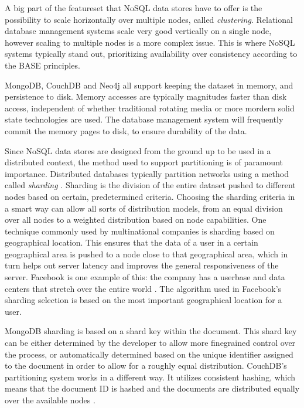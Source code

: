 A big part of the featureset that NoSQL data stores have to offer is the possibility to scale horizontally over multiple nodes, called \textit{clustering}.
Relational database management systems scale very good vertically on a single node, however scaling to multiple nodes is a more complex issue.
This is where NoSQL systems typically stand out, prioritizing availability over consistency according to the BASE principles.

MongoDB, CouchDB and Neo4j all support keeping the dataset in memory, and persistence to disk.
Memory accesses are typically magnitudes faster than disk access, independent of whether traditional rotating media or more mordern solid state technologies are used.
The database management system will frequently commit the memory pages to disk, to ensure durability of the data.

Since NoSQL data stores are designed from the ground up to be used in a distributed context, the method used to support partitioning is of paramount importance.
Distributed databases typically partition networks using a method called \textit{sharding} \autocite{MongoDB2009Sharding}.
Sharding is the division of the entire dataset pushed to different nodes based on certain, predetermined criteria.
Choosing the sharding criteria in a smart way can allow all sorts of distribution models, from an equal division over all nodes to a weighted distribution based on node capabilities.
One technique commonly used by multinational companies is sharding based on geographical location.
This ensures that the data of a user in a certain geographical area is pushed to a node close to that geographical area, which in turn helps out server latency and improves the general responsiveness of the server.
Facebook is one example of this: the company has a userbase and data centers that stretch over the entire world \autocite{Barrigas2015}.
The algorithm used in Facebook's sharding selection is based on the most important geographical location for a user.

MongoDB sharding is based on a shard key within the document.
This shard key can be either determined by the developer to allow more finegrained control over the process, or automatically determined based on the unique identifier assigned to the document in order to allow for a roughly equal distribution.
CouchDB's partitioning system works in a different way.
It utilizes consistent hashing, which means that the document ID is hashed and the documents are distributed equally over the available nodes \autocite{CouchDB2005ConsistentHashing}.

